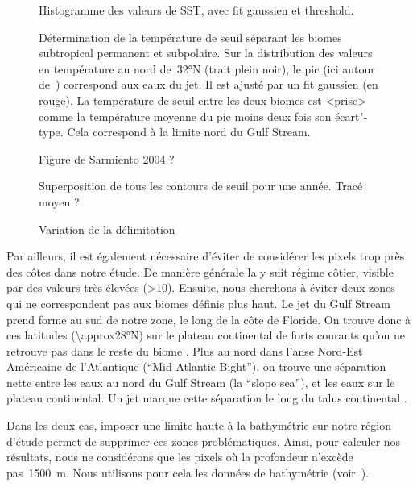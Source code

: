 \begin{figure}
  Histogramme des valeurs de SST, avec fit gaussien et threshold.
  \caption[Délimitation des biomes subtropical permanent et subpolaire par température seuil]{
    Détermination de la température de seuil séparant les biomes subtropical permanent et subpolaire.
    Sur la distribution des valeurs en température au nord de~\ang{32}N (trait plein noir), le pic (ici autour de~) correspond aux eaux du jet. Il est ajusté par un fit gaussien (en rouge).
    La température de seuil entre les deux biomes est <prise> comme la température moyenne du pic moins deux fois son écart"-type.
    Cela correspond à la limite nord du Gulf Stream.
  }
  \label{fig:temp-seuil-distrib}
\end{figure}

\begin{figure}
  \caption{Figure de Sarmiento 2004 ?}
  \label{fig:sarmiento}
\end{figure}

\begin{figure}
  Superposition de tous les contours de seuil pour une année.
  Tracé moyen ?
  \caption{Variation de la délimitation}
  \label{fig:var-delim}
\end{figure}

Par ailleurs, il est également nécessaire d'éviter de considérer les pixels trop près des côtes dans notre étude.
De manière générale la  y suit régime côtier, visible par des valeurs très élevées (\qty{>10}{\mgm}).
Ensuite, nous cherchons à éviter deux zones qui ne correspondent pas aux biomes définis plus haut.
Le jet du Gulf Stream prend forme au sud de notre zone, le long de la côte de Floride. On trouve donc à ces latitudes (\ang{\approx28}N) sur le plateau continental de forts courants qu'on ne retrouve pas dans le reste du biome .
Plus au nord dans l'anse Nord-Est Américaine de l'Atlantique (\enquote{Mid-Atlantic Bight}), on trouve une séparation nette entre les eaux au nord du Gulf Stream (la \enquote{slope sea}), et les eaux sur le plateau continental.
Un jet marque cette séparation le long du talus continental \parencite{flagg_2006}.

Dans les deux cas, imposer une limite haute à la bathymétrie sur notre région d'étude permet de supprimer ces zones problématiques.
Ainsi, pour calculer nos résultats, nous ne considérons que les pixels où la profondeur n'excède pas~\qty{1500}{\m}.
Nous utilisons pour cela les données de bathymétrie  (voir~).

